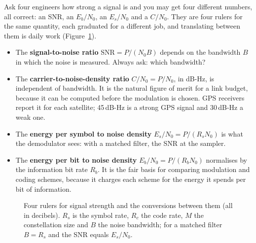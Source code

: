 Ask four engineers how strong a signal is and you may get four different numbers, all correct: an SNR, an
$E_b/N_0$, an $E_s/N_0$ and a $C/N_0$. They are four rulers for the same quantity, each graduated for a
different job, and translating between them is daily work (Figure~\ref{fig:ch03_ratios}).
\begin{itemize}
\item The \textbf{signal-to-noise ratio} $\mathrm{SNR}=P/(N_0B)$ depends on the bandwidth $B$ in which
the noise is measured. Always ask: which bandwidth?
\item The \textbf{carrier-to-noise-density ratio} $C/N_0=P/N_0$, in dB-Hz, is independent of bandwidth.
It is the natural figure of merit for a link budget, because it can be computed before the modulation is
chosen. GPS receivers report it for each satellite; 45\,dB-Hz is a strong GPS signal and 30\,dB-Hz a weak
one.
\item The \textbf{energy per symbol to noise density} $E_s/N_0=P/(R_sN_0)$ is what the demodulator sees:
with a matched filter, the SNR at the sampler.
\item The \textbf{energy per bit to noise density} $E_b/N_0=P/(R_bN_0)$ normalises by the information bit
rate $R_b$. It is the fair basis for comparing modulation and coding schemes, because it charges each
scheme for the energy it spends per bit of information.
\end{itemize}

\begin{figure}[htbp]\centering
{}
\caption{Four rulers for signal strength and the conversions between them (all in decibels). $R_s$ is the
symbol rate, $R_c$ the code rate, $M$ the constellation size and $B$ the noise bandwidth; for a matched
filter $B=R_s$ and the SNR equals $E_s/N_0$.}
\label{fig:ch03_ratios}
\end{figure}

